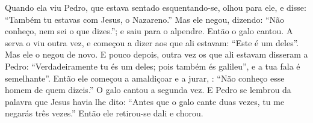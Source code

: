 {  Quando ela viu Pedro, que estava sentado esquentando-se, olhou para ele, e disse: “Também tu estavas com Jesus, o Nazareno.”
  Mas ele negou, dizendo: “Não
{} conheço, nem sei o que dizes.”; e saiu para o alpendre. Então o galo cantou.
  A serva o viu outra vez, e começou a dizer aos que ali estavam: “Este é um deles”.
  Mas ele o negou de novo. E pouco depois, outra vez os que ali estavam disseram a Pedro: “Verdadeiramente tu és um deles; pois também és galileu”, e a tua fala é semelhante”.
  Então ele começou a amaldiçoar e a jurar,
{} : “Não conheço esse homem de quem dizeis.”
  O galo cantou a segunda vez. E Pedro se lembrou da palavra que Jesus havia lhe dito: “Antes que o galo cante duas vezes, tu me negarás três vezes.” Então ele retirou-se dali e chorou.
\par }

